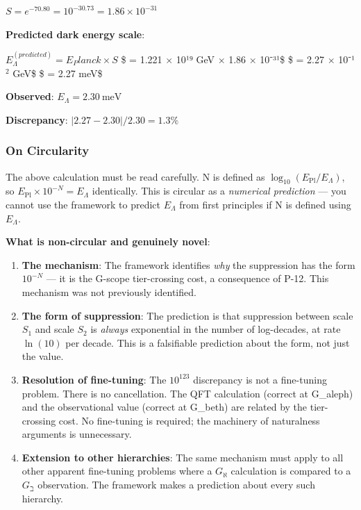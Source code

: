 \documentclass[12pt,a4paper]{article}
\begin{document}
$S  =  e^{−70.80}  =  10^{−30.73}  =  1.86 \times 10^{−31}$

\textbf{Predicted dark energy scale}:

$E_{\Lambda}^(predicted)  =  E_Planck \times S$
\$                 =  1.221 $\times$ 10¹⁹ GeV $\times$ 1.86 $\times$ 10⁻³¹\$
\$                 =  2.27 $\times$ 10⁻¹$^{2}$ GeV\$
\$                 =  2.27 meV\$

\textbf{Observed}: $E_{\Lambda} = 2.30\ \text{meV}$

\textbf{Discrepancy}: $|2.27 - 2.30| / 2.30 = \mathbf{1.3\%}$

\subsubsection{On Circularity}

The above calculation must be read carefully. N is defined as $\log_{10}(E_{\text{Pl}} / E_{\Lambda})$, so $E_{\text{Pl}} \times 10^{-N} = E_{\Lambda}$ identically. This is circular as a \emph{numerical prediction} --- you cannot use the framework to predict $E_{\Lambda}$ from first principles if N is defined using $E_{\Lambda}$.

\textbf{What is non-circular and genuinely novel}:

\begin{enumerate}
    \item \textbf{The mechanism}: The framework identifies \emph{why} the suppression has the form $10^{-N}$ --- it is the G-scope tier-crossing cost, a consequence of P-12. This mechanism was not previously identified.
    \item \textbf{The form of suppression}: The prediction is that suppression between scale $S_1$ and scale $S_2$ is \emph{always} exponential in the number of log-decades, at rate $\ln(10)$ per decade. This is a falsifiable prediction about the form, not just the value.
    \item \textbf{Resolution of fine-tuning}: The $10^{123}$ discrepancy is not a fine-tuning problem. There is no cancellation. The QFT calculation (correct at G\_aleph) and the observational value (correct at G\_beth) are related by the tier-crossing cost. No fine-tuning is required; the machinery of naturalness arguments is unnecessary.
    \item \textbf{Extension to other hierarchies}: The same mechanism must apply to all other apparent fine-tuning problems where a $G_{\aleph}$ calculation is compared to a $G_{\beth}$ observation. The framework makes a prediction about every such hierarchy.
\end{enumerate}
\end{document}

